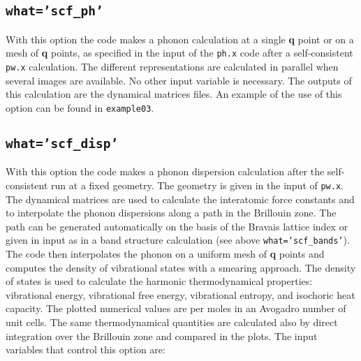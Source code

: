 \documentclass[12pt,a4paper]{article}
\begin{document}
\subsection{\texttt{what='scf\_ph'}}
With this option the code makes a phonon calculation at a single {\bf q} 
point or on a mesh of {\bf q} points, as specified in the input of 
the \texttt{ph.x} code after a self-consistent \texttt{pw.x} calculation. 
The different representations are calculated in parallel when several images 
are available. No other input variable is necessary. The outputs of this 
calculation are the dynamical matrices files.
An example of the use of this option can be found in \texttt{example03}.

\subsection{\texttt{what='scf\_disp'}}
With this option the code makes a phonon dispersion calculation after the 
self-consistent run at a fixed geometry. The geometry is given in the 
input of \texttt{pw.x}. The dynamical matrices are used to calculate 
the interatomic force constants and to interpolate the phonon dispersions 
along a path in the Brillouin zone. The path can be generated automatically 
on the basis of the Bravais lattice index or given in input as in a band 
structure calculation (see above \texttt{what='scf\_bands'}). The code then 
interpolates the phonon on a uniform mesh of {\bf q} points and computes the 
density of vibrational states with a smearing approach. The density of 
states is used to calculate the harmonic thermodynamical properties: 
vibrational energy, vibrational free energy, vibrational entropy, and 
isochoric heat capacity.
The plotted numerical values are per moles in an Avogadro number of unit 
cells. The same thermodynamical quantities are calculated also by direct 
integration over the Brillouin zone and compared in the plots.
The input variables that control this option are:
\end{document}

